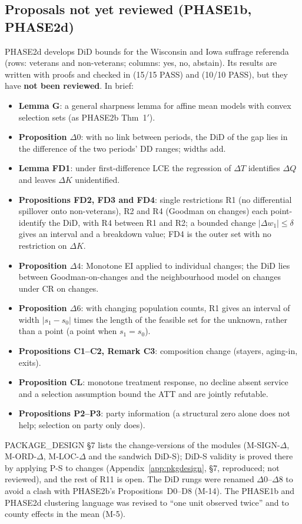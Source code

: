 \subsection{Proposals not yet reviewed (PHASE1b, PHASE2d)}

PHASE2d develops DiD bounds for the Wisconsin and Iowa suffrage referenda (rows:
veterans and non-veterans; columns: yes, no, abstain). Its results are written
with proofs and checked in  (15/15 PASS) and
 (10/10 PASS), but they have \textbf{not been reviewed}.
In brief:
\begin{itemize}[nosep]
\item \textbf{Lemma G}: a general sharpness lemma for affine mean models with
convex selection sets (as PHASE2b Thm~1$'$).
\item \textbf{Proposition $\Delta0$}: with no link between periods, the DiD of the
gap lies in the difference of the two periods' DD ranges; widths add.
\item \textbf{Lemma FD1}: under first-difference LCE the regression of $\Delta T$
identifies $\Delta Q$ and leaves $\Delta K$ unidentified.
\item \textbf{Propositions FD2, FD3 and FD4}: single restrictions R1 (no differential
spillover onto non-veterans), R2 and R4 (Goodman on changes) each point-identify
the DiD, with R4 between R1 and R2; a bounded change $|\Delta w_1|\le\delta$ gives
an interval and a breakdown value; FD4 is the outer set with no restriction on
$\Delta K$.
\item \textbf{Proposition $\Delta4$}: Monotone EI applied to individual changes;
the DiD lies between Goodman-on-changes and the neighbourhood model on changes
under CR on changes.
\item \textbf{Proposition $\Delta6$}: with changing population counts, R1 gives an
interval of width $|s_1-s_0|$ times the length of the feasible set for the
unknown, rather than a point (a point when $s_1=s_0$).
\item \textbf{Propositions C1--C2, Remark C3}: composition change (stayers,
aging-in, exits).
\item \textbf{Proposition CL}: monotone treatment response, no decline absent
service and a selection assumption bound the ATT and are jointly refutable.
\item \textbf{Propositions P2--P3}: party information (a structural zero alone does
not help; selection on party only does).
\end{itemize}
PACKAGE\_DESIGN \S7 lists the change-versions of the modules (M-SIGN-$\Delta$,
M-ORD-$\Delta$, M-LOC-$\Delta$ and the sandwich DiD-S); DiD-S validity is
proved there by applying P-S to changes (Appendix~\ref{app:pkgdesign}, \S7,
reproduced; not reviewed), and the rest of R11 is open. The DiD
rungs were renamed $\Delta0$--$\Delta8$ to avoid a clash with PHASE2b's
Propositions~D0--D8 (M-14). The PHASE1b and PHASE2d clustering language was
revised to ``one unit observed twice'' and to county effects in the mean (M-5).
